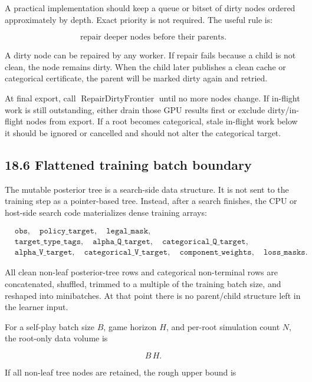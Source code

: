 \documentclass[11pt]{article}
\newcommand{\RepairDirtyFrontier}{\operatorname{RepairDirtyFrontier}}
\begin{document}
A practical implementation should keep a queue or bitset of dirty nodes ordered
approximately by depth. Exact priority is not required. The useful rule is:

\[
\text{repair deeper nodes before their parents}.
\]

A dirty node can be repaired by any worker. If repair fails because a child is
not clean, the node remains dirty. When the child later publishes a clean cache
or categorical certificate, the parent will be marked dirty again and retried.

At final export, call \(\RepairDirtyFrontier\) until no more nodes change. If
in-flight work is still outstanding, either drain those GPU results first or
exclude dirty/in-flight nodes from export. If a root becomes categorical, stale
in-flight work below it should be ignored or cancelled and should not alter the
categorical target.

\subsection*{18.6 Flattened training batch boundary}

The mutable posterior tree is a search-side data structure. It is not sent to the
training step as a pointer-based tree. Instead, after a search finishes, the CPU
or host-side search code materializes dense training arrays:

\[
\begin{aligned}
&\texttt{obs},
\quad \texttt{policy\_target},
\quad \texttt{legal\_mask},\\
&\texttt{target\_type\_tags},
\quad \texttt{alpha\_Q\_target},
\quad \texttt{categorical\_Q\_target},\\
&\texttt{alpha\_V\_target},
\quad \texttt{categorical\_V\_target},
\quad \texttt{component\_weights},
\quad \texttt{loss\_masks}.
\end{aligned}
\]

All clean non-leaf posterior-tree rows and categorical non-terminal rows are
concatenated, shuffled, trimmed to a multiple of the training batch size, and
reshaped into minibatches. At that point there is no parent/child structure left
in the learner input.

For a self-play batch size \(B\), game horizon \(H\), and per-root simulation
count \(N\), the root-only data volume is

\[
B\,H.
\]

If all non-leaf tree nodes are retained, the rough upper bound is
\end{document}
